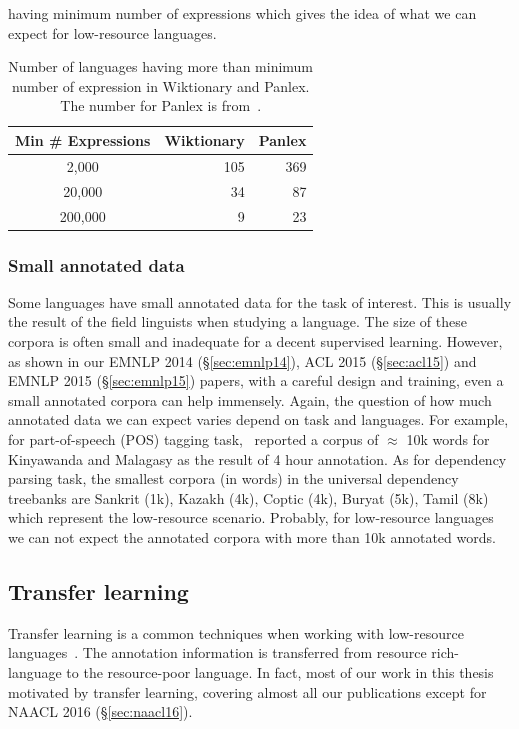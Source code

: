 \documentclass[12pt,twoside,final,hidelinks]{ltthesis}
\theoremstyle{definition}
\newcommand\emnlpiv{EMNLP 2014 (\S\ref{sec:emnlp14})}
\newcommand\aclv{ACL 2015 (\S\ref{sec:acl15})}
\newcommand\emnlpv{EMNLP 2015 (\S\ref{sec:emnlp15})}
\newcommand\naaclvi{NAACL 2016 (\S\ref{sec:naacl16})}
\begin{document}
having minimum number of expressions which gives the idea of what we can expect for low-resource languages. 
\begin{table}
\centering
\begin{tabular}{crr}
\toprule
Min \# Expressions & Wiktionary & Panlex \\
\midrule
2,000          & 105        & 369    \\
20,000         & 34         & 87     \\
200,000        & 9          & 23    \\
\bottomrule
\end{tabular}
\caption[Number of languages having more than minimum number of expression in Wiktionary and Panlex]{Number of languages having more than minimum number of expression in Wiktionary and Panlex. The number for Panlex is from~\protect{}.}
\label{tab:expression_wik_pan}
\end{table}


\subsubsection{Small annotated data}
Some languages have small annotated data for the task of interest. This is usually the result 
of the field linguists when studying a language. The size of these corpora is often small and 
inadequate for a decent supervised learning. However, as shown in our \emnlpiv{}, \aclv{} and 
\emnlpv{} papers, with a careful design and training, even a small annotated corpora can help immensely. Again, the question of how much annotated data we can expect varies depend on task and languages. For example, for part-of-speech (POS) tagging task,~ reported a corpus of $\approx$ 10k words for Kinyawanda and Malagasy as the result of 4 hour annotation. As for dependency parsing task, the smallest corpora (in words) in the universal dependency treebanks are Sankrit (1k), Kazakh (4k), Coptic (4k), Buryat (5k), Tamil (8k) which represent the low-resource scenario. Probably, for low-resource languages we can not expect the annotated corpora with more than 10k annotated words. 

\subsection{Transfer learning}
Transfer learning is a common techniques when working with low-resource 
languages~\cite{TackstromDPMN13,Das:2011,YarowskyAndNgai,duongIJCNLP,Hwa:2005:BPV,P14-1126}. The annotation information is transferred from resource rich-language to the resource-poor language. In fact, most of our work in this thesis motivated by transfer learning, covering almost all our publications except for \naaclvi. 
\end{document}
